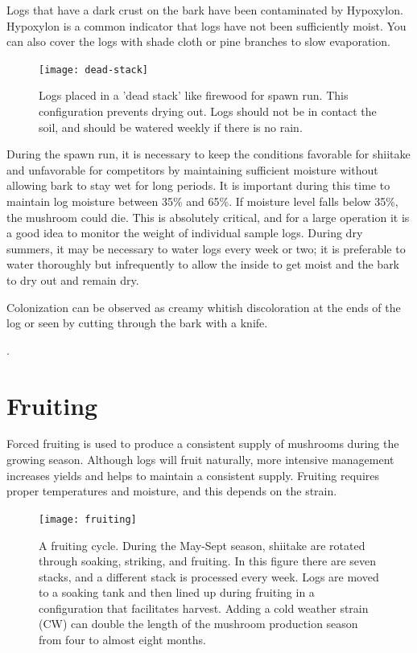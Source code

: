 \documentclass{tufte-handout}
\begin{document}
Logs that have a dark crust on the bark have been contaminated by Hypoxylon. 
Hypoxylon is a common indicator that logs have not been sufficiently moist.
You can also cover the logs with shade cloth or pine branches to slow evaporation.


\begin{figure}
\texttt{[image: dead-stack]}
\caption{Logs placed in a 'dead stack' like firewood for spawn run. This configuration prevents drying out. Logs should not be in contact the soil, and should be watered weekly if there is no rain.}
\end{figure}

During the spawn run, it is necessary to keep the conditions favorable for shiitake and unfavorable for competitors by maintaining sufficient moisture without allowing bark to stay wet for long periods. It is important during this time to maintain log moisture between 35\% and 65\%. 
If moisture level falls below 35\%, the mushroom could die.
This is absolutely critical, and for a large operation it is a good idea to monitor the weight of individual sample logs. 
During dry summers, it may be necessary to water logs every week or two; it is preferable to water thoroughly but infrequently to allow the inside to get moist and the bark to dry out and remain dry. 

Colonization can be observed as creamy whitish discoloration at the ends of the log or seen by cutting through the bark with a knife.

. 
\section{Fruiting}

Forced fruiting is used to produce a consistent supply of mushrooms during the growing season. 
Although logs will fruit naturally, more intensive management increases yields and helps to maintain a consistent supply. Fruiting requires proper temperatures and moisture, and this depends on the strain.

\begin{figure}
\texttt{[image: fruiting]}
\caption{A fruiting cycle. During the May-Sept season, shiitake are rotated through soaking, striking, and fruiting. 
In this figure there are seven stacks, and a different stack is processed every week. Logs are moved to a soaking tank and then lined up during fruiting in a configuration that facilitates harvest.
Adding a cold weather strain (CW) can double the length of the mushroom production season from four to almost eight months.}
\end{figure}
\end{document}
